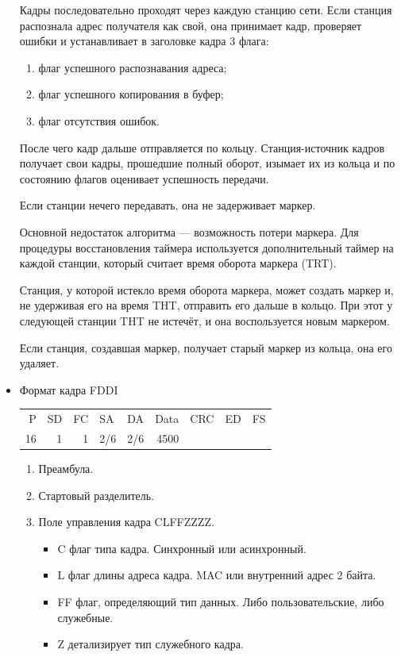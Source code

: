 \documentclass[12pt, russian, oneside, article]{ncc}
\begin{document}
\begin{itemize}
Кадры последовательно проходят через каждую станцию сети. Если станция распознала адрес получателя как свой, она принимает кадр, проверяет ошибки и устанавливает в заголовке кадра 3 флага:
\begin{enumerate}
\item флаг успешного распознавания адреса;
\item флаг успешного копирования в буфер;
\item флаг отсутствия ошибок.
\end{enumerate}

После чего кадр дальше отправляется по кольцу. Станция-источник кадров получает свои кадры, прошедшие полный оборот, изымает их из кольца и по состоянию флагов оценивает успешность передачи.

Если станции нечего передавать, она не задерживает маркер.

Основной недостаток алгоритма --- возможность потери маркера. Для процедуры восстановления таймера используется дополнительный таймер на каждой станции, который считает время оборота маркера (TRT). 

Станция, у которой истекло время оборота маркера, может создать маркер и, не удерживая его на время THT, отправить его дальше в кольцо. При этот у следующей станции THT не истечёт, и она воспользуется новым маркером.

Если станция, создавшая маркер, получает старый маркер из кольца, она его удаляет.


\item Формат кадра FDDI\\
\label{sec-5_2_2_3}%
\begin{center}
\begin{tabular}{rrrllrlll}
  P  &  SD  &  FC  &  SA   &  DA   &  Data  &  CRC  &  ED  &  FS  \\
 16  &   1  &   1  &  2/6  &  2/6  &  4500  &       &      &      \\
\end{tabular}
\end{center}



\begin{enumerate}
\item Преамбула.
\item Стартовый разделитель.
\item Поле управления кадра CLFFZZZZ.

\begin{itemize}
\item C флаг типа кадра. Синхронный или асинхронный.
\item L флаг длины адреса кадра. MAC или внутренний адрес 2 байта.
\item FF флаг, определяющий тип данных. Либо пользовательские, либо служебные.
\item Z детализирует тип служебного кадра.
\end{itemize}


\end{enumerate}
\end{itemize}
\end{document}
